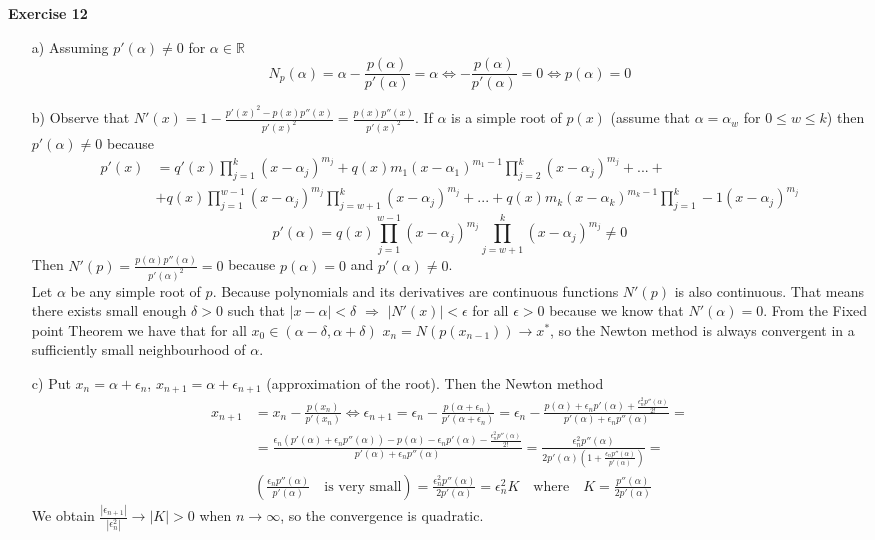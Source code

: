 \documentclass[12pt,letterpaper]{article}
\theoremstyle{definition}
\begin{document}
\textbf{Exercise 12} 
\begin{itemize}
    \item[a)]
    Assuming $p'(\alpha)\neq 0$ for $\alpha \in \mathbb{R}$
    \[N_p(\alpha)=\alpha-\frac{p(\alpha)}{p'(\alpha)}=\alpha \iff -\frac{p(\alpha)}{p'(\alpha)}=0 \iff p(\alpha)=0 \]
    \item[b)] Observe that $N'(x)=1-\frac{p'(x)^2-p(x)p''(x)}{p'(x)^2}=\frac{p(x)p''(x)}{p'(x)^2}$. If $\alpha$ is a simple root of $p(x)$ (assume that $\alpha=\alpha_w$ for $0\leq w \leq k$) then $p'(\alpha)\neq 0$ because
     \begin{equation}
     \begin{aligned}
        p'(x)&=q'(x)\prod_{j=1}^k (x-\alpha_j)^{m_j}+q(x)m_1(x-\alpha_1)^{m_1-1}\prod_{j=2}^k (x-\alpha_j)^{m_j}+...+ \\
        & +q(x)\prod_{j=1}^{w-1} (x-\alpha_j)^{m_j} \prod_{j=w+1}^k (x-\alpha_j)^{m_j} +...+q(x)m_k(x-\alpha_k)^{m_k-1}\prod_{j=1}^k-1 (x-\alpha_j)^{m_j}
     \end{aligned}
     \end{equation}
    \[p'(\alpha)=q(x)\prod_{j=1}^{w-1} (x-\alpha_j)^{m_j} \prod_{j=w+1}^k (x-\alpha_j)^{m_j}\neq 0\]
    Then $N'(p)=\frac{p(\alpha)p''(\alpha)}{p'(\alpha)^2}=0$ because $p(\alpha)=0$ and $p'(\alpha)\neq 0$. \\
    Let $\alpha$ be any simple root of $p$. Because polynomials and its derivatives are continuous functions $N'(p)$ is also continuous. That means there exists small enough $\delta>0$ such that $|x-\alpha|<\delta$ $\Rightarrow$ $|N'(x)|<\epsilon$ for all $\epsilon>0$ because we know that $N'(\alpha)=0$. From the Fixed point Theorem we have that for all $x_0\in(\alpha-\delta,\alpha+\delta)$ $x_n=N(p(x_{n-1}))\to x^*$, so the Newton method is always convergent in a sufficiently small neighbourhood of $\alpha$.
    \item[c)]
    Put $x_n=\alpha + \epsilon_n$, $x_{n+1}=\alpha + \epsilon_{n+1}$ (approximation of the root). Then the Newton method
    \begin{equation}
    \begin{aligned}
    x_{n+1}&=x_n-\frac{p(x_n)}{p'(x_n)} \iff \epsilon_{n+1}=\epsilon_n - \frac{p(\alpha+\epsilon_n)}{p'(\alpha+\epsilon_n)}=\epsilon_n - \frac{p(\alpha)+\epsilon_n p'(\alpha)+\frac{\epsilon_n^2 p''(\alpha)}{2!}}{p'(\alpha)+\epsilon_n p''(\alpha)}=\\ 
    &=\frac{\epsilon_n (p'(\alpha)+\epsilon_n p''(\alpha))-p(\alpha)-\epsilon_n p'(\alpha)-\frac{\epsilon_n^2 p''(\alpha)}{2!}}{p'(\alpha)+\epsilon_n p''(\alpha)}=\frac{\epsilon_n^2p''(\alpha)}{2p'(\alpha)(1+\frac{\epsilon_n p''(\alpha)}{p'(\alpha)})}= \\
    & (\frac{\epsilon_n p''(\alpha)}{p'(\alpha)} \quad \text{is very small})= \frac{\epsilon_n^2p''(\alpha)}{2p'(\alpha)}=\epsilon_n^2K \quad \text{where} \quad K=\frac{p''(\alpha)}{2p'(\alpha)}
    \end{aligned} 
    \end{equation}
    We obtain $\frac{|\epsilon_{n+1}|}{|\epsilon_n^2|}\to|K|>0$ when $n\to\infty$, so the convergence is quadratic.
\end{itemize}
\end{document}
